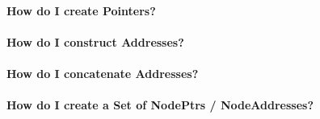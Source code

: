 \paragraph{How do I create Pointers?}

\paragraph{How do I construct Addresses?}

\paragraph{How do I concatenate Addresses?}

\paragraph{How do I create a Set of NodePtrs / NodeAddresses?}



